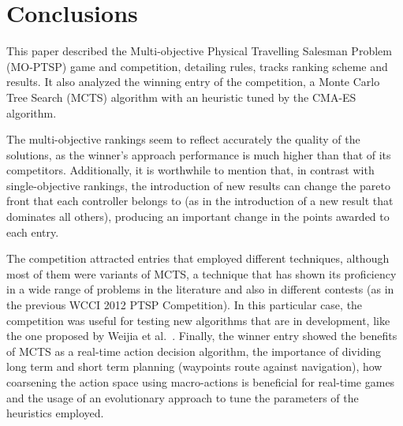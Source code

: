\documentclass[conference]{IEEEtran}
\begin{document}
\section{Conclusions} \label{sec:conc}

This paper described the Multi-objective Physical Travelling Salesman Problem (MO-PTSP) game and competition, detailing rules, tracks ranking scheme and results. It also analyzed the winning entry of the competition, a Monte Carlo Tree Search (MCTS) algorithm with an heuristic tuned by the CMA-ES algorithm.  

The multi-objective rankings seem to reflect accurately the quality of the solutions, as the winner's approach performance is much higher than that of its competitors. Additionally, it is worthwhile to mention that, in contrast with single-objective rankings, the introduction of new results can change the pareto front that each controller belongs to (as in the introduction of a new result that dominates all others), producing an important change in the points awarded to each entry.

The competition attracted entries that employed different techniques, although most of them were variants of MCTS, a technique that has shown its proficiency in a wide range of problems in the literature and also in different contests (as in the previous WCCI 2012 PTSP Competition). In this particular case, the competition was useful for testing new algorithms that are in development, like the one proposed by Weijia et al.~\cite{Wang13}. Finally, the winner entry showed the benefits of MCTS as a real-time action decision algorithm, the importance of dividing long term and short term planning (waypoints route against navigation), how coarsening the action space using macro-actions is beneficial for real-time games and the usage of an evolutionary approach to tune the parameters of the heuristics employed.




\end{document}
